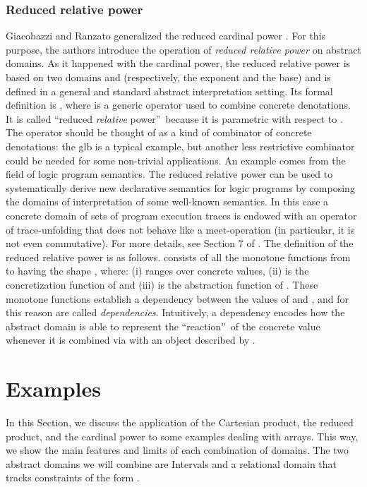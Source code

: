 \documentclass[submission,copyright,creativecommons]{eptcs}
\begin{document}
\subsubsection{Reduced relative power}
Giacobazzi and Ranzato generalized the reduced cardinal power \cite{GR99}. For this purpose, the authors introduce the operation of \emph{reduced relative power} on abstract domains. As it happened with the cardinal power, the reduced relative power is based on two domains  and  (respectively, the exponent and the base) and is defined in a general and standard abstract interpretation setting. Its formal definition is , where  is a generic operator used to combine concrete denotations. It is called \textquotedblleft reduced \emph{relative} power\textquotedblright\ because it is parametric with respect to . The operator  should be thought of as a kind of combinator of concrete denotations: the glb is a typical example, but another less restrictive combinator could be needed for some non-trivial applications. An example comes from the field of logic program semantics. The reduced relative power can be used to systematically derive new declarative semantics for logic programs by composing the domains of interpretation of some well-known semantics. In this case a concrete domain of sets of program execution traces is endowed with an operator of trace-unfolding that does not behave like a meet-operation (in particular, it is not even commutative). For more details, see Section 7 of \cite{GR99}. The definition of the reduced relative power is as follows.  consists of all the monotone functions from  to  having the shape , where: (i)  ranges over concrete values, (ii)  is the concretization function of  and (iii)  is the abstraction function of . These monotone functions establish a dependency between the values of  and , and for this reason are called \emph{dependencies}. Intuitively, a dependency encodes how the abstract domain  is able to represent the \textquotedblleft reaction\textquotedblright\ of the concrete value  whenever it is combined via  with an object described by .





\section{Examples}
\label{sect:motivatingexamples}
In this Section, we discuss the application of the Cartesian product, the reduced product, and the cardinal power to some examples dealing with arrays. This way, we show the main features and limits of each combination of domains. The two abstract domains we will combine are Intervals \cite{CC77} and a relational domain that tracks constraints of the form .
\end{document}
